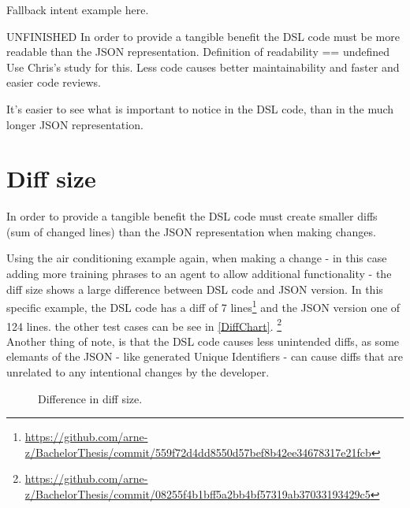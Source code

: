 Fallback intent example here.

UNFINISHED
In order to provide a tangible benefit the DSL code must be more readable than the JSON representation.
\citeNeeded Definition of readability == undefined
Use Chris's study for this.
Less code causes better maintainability and faster and easier code reviews. 

It's easier to see what is important to notice in the DSL code, than in the much longer JSON representation.


\section{Diff size}
In order to provide a tangible benefit the DSL code must create smaller diffs (sum of changed lines) than the JSON representation when making changes.

Using the air conditioning example again, when making a change - in this case adding more training phrases to an agent to allow additional functionality - the diff size shows a large difference between DSL code and JSON version. In this specific example, the DSL code has a diff of 7 lines\footnote{\url{https://github.com/arne-z/BachelorThesis/commit/559f72d4dd8550d57bef8b42ee34678317e21fcb}} and the JSON version one of 124 lines. the other test cases can be see in \autoref{DiffChart}.
\footnote{\url{https://github.com/arne-z/BachelorThesis/commit/08255f4b1bff5a2bb4bf57319ab37033193429c5}}\\
Another thing of note, is that the DSL code causes less unintended diffs, as some elemants of the JSON - like generated Unique Identifiers - can cause diffs that are unrelated to any intentional changes by the developer.


\begin{figure}
    \centering
    
    \caption{Difference in diff size.}
    \label{DiffChart}
    
\end{figure}

